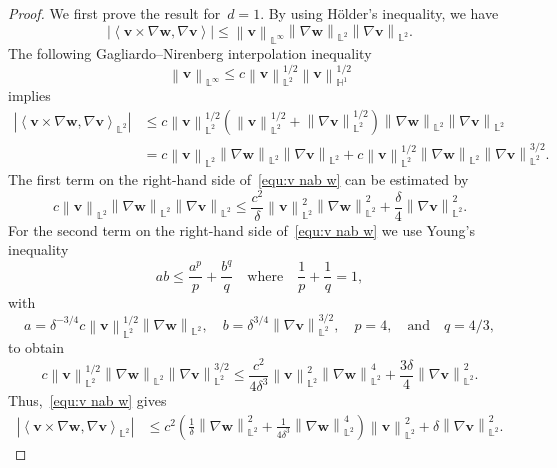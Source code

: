 \documentclass[11pt,reqno]{amsart}
\theoremstyle{definition}
\numberwithin{equation}{section}
\newcommand{\bff}{\boldsymbol}
\newcommand{\bb}{\mathbb}
\newcommand{\nn}{\nonumber}
\newcommand{\norm}[2]{\left\|{#1}\right\|_{#2}}
\newcommand{\inpro}[2]{\left\langle#1,#2\right\rangle}
\begin{document}
\begin{proof}
	We first prove the result for~$d=1$. By using H\"older's inequality, we have
	\[
	\left|\inpro{\bff{v}\times\nabla\bff{w}}{\nabla\bff{v}}\right|
	\le
	\norm{\bff{v}}{\bb{L}^\infty}
	\norm{\nabla\bff{w}}{\bb{L}^2} 
	\norm{\nabla\bff{v}}{\bb{L}^2}.
	\]
	The following Gagliardo--Nirenberg interpolation inequality
	\[
	\norm{\bff{v}}{\bb{L}^\infty}
	\le
	c
	\norm{\bff{v}}{\bb{L}^2}^{1/2}
	\norm{\bff{v}}{\bb{H}^1}^{1/2}
	\]
	implies
	\begin{align}\label{equ:v nab w}
		\left|\inpro{\bff{v}\times\nabla\bff{w}}{\nabla\bff{v}}_{\bb{L}^2}\right|
		&\le
		c
		\norm{\bff{v}}{\bb{L}^2}^{1/2}
		\left(
		\norm{\bff{v}}{\bb{L}^2}^{1/2}
		+
		\norm{\nabla\bff{v}}{\bb{L}^2}^{1/2}
		\right)
		\norm{\nabla\bff{w}}{\bb{L}^2}
		\norm{\nabla\bff{v}}{\bb{L}^2}
		\nn\\
		&=
		c
		\norm{\bff{v}}{\bb{L}^2}
		\norm{\nabla\bff{w}}{\bb{L}^2}
		\norm{\nabla\bff{v}}{\bb{L}^2}
		+
		c
		\norm{\bff{v}}{\bb{L}^2}^{1/2}
		\norm{\nabla\bff{w}}{\bb{L}^2}
		\norm{\nabla\bff{v}}{\bb{L}^2}^{3/2}.
	\end{align}
	The first term on the right-hand side of~\eqref{equ:v nab w} can be estimated by
	\[
	c\norm{\bff{v}}{\bb{L}^2}
	\norm{\nabla\bff{w}}{\bb{L}^2}
	\norm{\nabla\bff{v}}{\bb{L}^2}
	\le
	\frac{c^2}{\delta}
	\norm{\bff{v}}{\bb{L}^2}^2
	\norm{\nabla\bff{w}}{\bb{L}^2}^2
	+
	\frac{\delta}{4}
	\norm{\nabla\bff{v}}{\bb{L}^2}^2.
	\]
	For the second term on the right-hand side of~\eqref{equ:v nab w} we use 
	Young's inequality 
	\[
	ab \le \frac{a^p}{p} + \frac{b^q}{q} \quad \text{where} \quad\frac{1}{p}+\frac{1}{q} = 1,
	\]
	with
	\[
	a=\delta^{-3/4} c \norm{\bff{v}}{\bb{L}^2}^{1/2}\norm{\nabla\bff{w}}{\bb{L}^2}, \quad 
	b=\delta^{3/4}\norm{\nabla\bff{v}}{\bb{L}^2}^{3/2}, \quad
	p=4,
	\quad\text{and}\quad
	q = 4/3,
	\]
	to obtain
	\[
	c \norm{\bff{v}}{\bb{L}^2}^{1/2}
	\norm{\nabla\bff{w}}{\bb{L}^2}
	\norm{\nabla\bff{v}}{\bb{L}^2}^{3/2}
	\le
	\frac{c^2}{4\delta^3}
	\norm{\bff{v}}{\bb{L}^2}^2
	\norm{\nabla\bff{w}}{\bb{L}^2}^4
	+
	\frac{3\delta}{4}
	\norm{\nabla\bff{v}}{\bb{L}^2}^2.
	\]
	Thus,~\eqref{equ:v nab w} gives
	\begin{align*}
		\left|\inpro{\bff{v}\times\nabla\bff{w}}{\nabla\bff{v}}_{\bb{L}^2}\right|
		&\le
		c^2 \left(
		\frac{1}{\delta}
		\norm{\nabla\bff{w}}{\bb{L}^2}^2
		+
		\frac{1}{4\delta^3}
		\norm{\nabla\bff{w}}{\bb{L}^2}^4
		\right)
		\norm{\bff{v}}{\bb{L}^2}^2
		+
		\delta
		\norm{\nabla\bff{v}}{\bb{L}^2}^2.
	\end{align*}
	

\end{proof}
\end{document}
